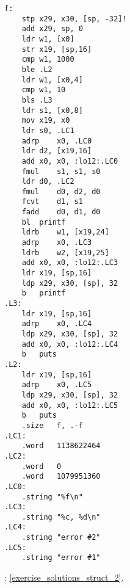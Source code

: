\begin{lstlisting}[caption=\Optimizing GCC 4.9 (ARM64)]
f:
	stp	x29, x30, [sp, -32]!
	add	x29, sp, 0
	ldr	w1, [x0]
	str	x19, [sp,16]
	cmp	w1, 1000
	ble	.L2
	ldr	w1, [x0,4]
	cmp	w1, 10
	bls	.L3
	ldr	s1, [x0,8]
	mov	x19, x0
	ldr	s0, .LC1
	adrp	x0, .LC0
	ldr	d2, [x19,16]
	add	x0, x0, :lo12:.LC0
	fmul	s1, s1, s0
	ldr	d0, .LC2
	fmul	d0, d2, d0
	fcvt	d1, s1
	fadd	d0, d1, d0
	bl	printf
	ldrb	w1, [x19,24]
	adrp	x0, .LC3
	ldrb	w2, [x19,25]
	add	x0, x0, :lo12:.LC3
	ldr	x19, [sp,16]
	ldp	x29, x30, [sp], 32
	b	printf
.L3:
	ldr	x19, [sp,16]
	adrp	x0, .LC4
	ldp	x29, x30, [sp], 32
	add	x0, x0, :lo12:.LC4
	b	puts
.L2:
	ldr	x19, [sp,16]
	adrp	x0, .LC5
	ldp	x29, x30, [sp], 32
	add	x0, x0, :lo12:.LC5
	b	puts
	.size	f, .-f
.LC1:
	.word	1138622464
.LC2:
	.word	0
	.word	1079951360
.LC0:
	.string	"%f\n"
.LC3:
	.string	"%c, %d\n"
.LC4:
	.string	"error #2"
.LC5:
	.string	"error #1"
\end{lstlisting}



\Answer{}: \ref{exercise_solutions_struct_2}.
